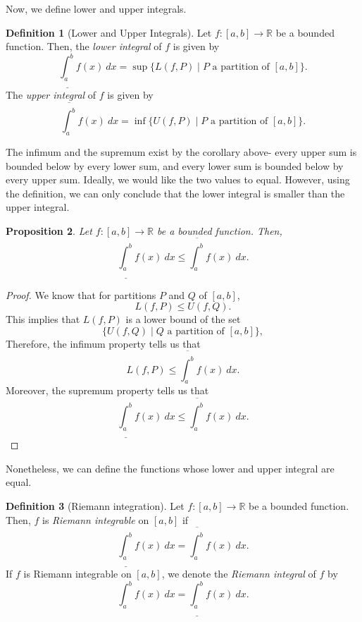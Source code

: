 \documentclass[a4paper, openany]{memoir}
\theoremstyle{definition}
\newtheorem{definition}{Definition}[section]
\theoremstyle{plain}
\newtheorem{proposition}[definition]{Proposition}
\begin{document}
Now, we define lower and upper integrals.
\begin{definition}[Lower and Upper Integrals]
Let $f: [a, b] \to \mathbb{R}$ be a bounded function. Then, the \emph{lower integral} of $f$ is given by
\[\underline{\int_a^b} f(x) \ dx = \sup \{L(f, P) \mid P \text{ a partition of } [a, b]\}.\]
The \emph{upper integral} of $f$ is given by
\[\overline{\int_a^b} f(x) \ dx = \inf \{U(f, P) \mid P \text{ a partition of } [a, b]\}.\]
\end{definition}
\noindent The infimum and the supremum exist by the corollary above- every upper sum is bounded below by every lower sum, and every lower sum is bounded below by every upper sum. Ideally, we would like the two values to equal. However, using the definition, we can only conclude that the lower integral is smaller than the upper integral.
\begin{proposition}
Let $f: [a, b] \to \mathbb{R}$ be a bounded function. Then,
\[\underline{\int_a^b} f(x) \ dx \leqslant \overline{\int_a^b} f(x) \ dx.\]
\end{proposition}
\begin{proof}
We know that for partitions $P$ and $Q$ of $[a, b]$,
\[L(f, P) \leqslant U(f, Q).\]
This implies that $L(f, P)$ is a lower bound of the set
\[\{U(f, Q) \mid Q \text{ a partition of } [a, b]\},\]
Therefore, the infimum property tells us that
\[L(f, P) \leqslant \overline{\int_a^b} f(x) \ dx.\]
Moreover, the supremum property tells us that
\[\underline{\int_a^b} f(x) \ dx \leqslant \overline{\int_a^b} f(x) \ dx.\]
\end{proof}
\noindent Nonetheless, we can define the functions whose lower and upper integral are equal.
\begin{definition}[Riemann integration]
Let $f: [a, b] \to \mathbb{R}$ be a bounded function. Then, $f$ is \emph{Riemann integrable} on $[a, b]$ if 
\[\underline{\int_a^b} f(x) \ dx = \overline{\int_a^b} f(x) \ dx.\]
If $f$ is Riemann integrable on $[a, b]$, we denote the \emph{Riemann integral} of $f$ by
\[\int_a^b f(x) \ dx = \underline{\int_a^b} f(x) \ dx.\]
\end{definition}
\end{document}
